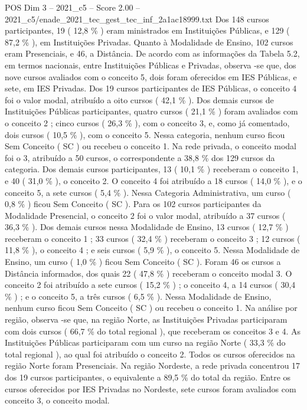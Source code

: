 \begin{textsample}{POS Dim 3 – 2021\_c5 – Score 2.00 – 2021\_c5/enade\_2021\_tec\_gest\_tec\_inf\_2a1ac18999.txt}
Dos 148 cursos participantes, 19 ( 12,8 \% ) eram ministrados em Instituições Públicas, e 129 ( 87,2 \% ), em Instituições Privadas.
Quanto à Modalidade de Ensino, 102 cursos eram Presenciais, e 46, a Distância.
De acordo com as informações da Tabela 5.2, em termos nacionais, entre Instituições Públicas e Privadas, observa -se que, dos nove cursos avaliados com o conceito 5, dois foram oferecidos em IES Públicas, e sete, em IES Privadas.
Dos 19 cursos participantes de IES Públicas, o conceito 4 foi o valor modal, atribuído a oito cursos ( 42,1 \% ).
Dos demais cursos de Instituições Públicas participantes, quatro cursos ( 21,1 \% ) foram avaliados com o conceito 2 ; cinco cursos ( 26,3 \% ), com o conceito 3, e, como já comentado, dois cursos ( 10,5 \% ), com o conceito 5.
Nessa categoria, nenhum curso ficou Sem Conceito ( SC ) ou recebeu o conceito 1.
Na rede privada, o conceito modal foi o 3, atribuído a 50 cursos, o correspondente a 38,8 \% dos 129 cursos da categoria.
Dos demais cursos participantes, 13 ( 10,1 \% ) receberam o conceito 1, e 40 ( 31,0 \% ), o conceito 2.
O conceito 4 foi atribuído a 18 cursos ( 14,0 \% ), e o conceito 5, a sete cursos ( 5,4 \% ).
Nessa Categoria Administrativa, um curso ( 0,8 \% ) ficou Sem Conceito ( SC ).
Para os 102 cursos participantes da Modalidade Presencial, o conceito 2 foi o valor modal, atribuído a 37 cursos ( 36,3 \% ).
Dos demais cursos nessa Modalidade de Ensino, 13 cursos ( 12,7 \% ) receberam o conceito 1 ; 33 cursos ( 32,4 \% ) receberam o conceito 3 ; 12 cursos ( 11,8 \% ), o conceito 4 ; e seis cursos ( 5,9 \% ), o conceito 5.
Nessa Modalidade de Ensino, um curso ( 1,0 \% ) ficou Sem Conceito ( SC ).
Foram 46 os cursos a Distância informados, dos quais 22 ( 47,8 \% ) receberam o conceito modal 3.
O conceito 2 foi atribuído a sete cursos ( 15,2 \% ) ; o conceito 4, a 14 cursos ( 30,4 \% ) ; e o conceito 5, a três cursos ( 6,5 \% ).
Nessa Modalidade de Ensino, nenhum curso ficou Sem Conceito ( SC ) ou recebeu o conceito 1.
Na análise por região, observa -se que, na região Norte, as Instituições Privadas participaram com dois cursos ( 66,7 \% do total regional ), que receberam os conceitos 3 e 4.
As Instituições Públicas participaram com um curso na região Norte ( 33,3 \% do total regional ), ao qual foi atribuído o conceito 2.
Todos os cursos oferecidos na região Norte foram Presenciais.
Na região Nordeste, a rede privada concentrou 17 dos 19 cursos participantes, o equivalente a 89,5 \% do total da região.
Entre os cursos oferecidos por IES Privadas no Nordeste, sete cursos foram avaliados com conceito 3, o conceito modal.

\end{textsample}
